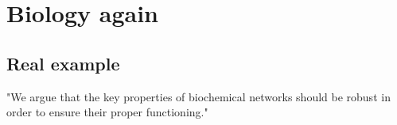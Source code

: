 \section{Biology again}
\label{sec:biology-again}
\subsection{Real example}
\label{subsec:}
\begin{frame}{\insertsubsection}
    "We argue that the key properties of biochemical networks should be robust in order to ensure their proper functioning."~\cite{Barkai1997}
\end{frame}
%
%